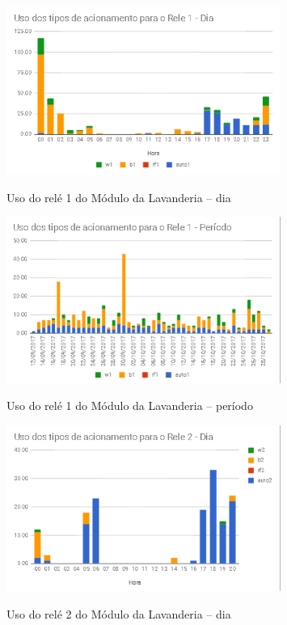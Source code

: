 \begin{figure}[H]
	\centering
	\caption{Uso do relé 1 do Módulo da Lavanderia -- dia}
	\includegraphics[width=0.8\textwidth]{usorele1Lavanderia}
	\label{fig:usorele1Lavanderia}
\end{figure}

\begin{figure}[H]
	\centering
	\caption{Uso do relé 1 do Módulo da Lavanderia -- período}
	\includegraphics[width=0.8\textwidth]{Usorele1lavanderiaperiodo}
	\label{fig:Usorele1lavanderiaperiodo}
\end{figure}

\begin{figure}[H]
	\centering
	\caption{Uso do relé 2 do Módulo da Lavanderia -- dia}
	\includegraphics[width=0.8\textwidth]{UsoRele2LavanderiaDia}
	\label{fig:UsoRele2LavanderiaDia}
\end{figure}

